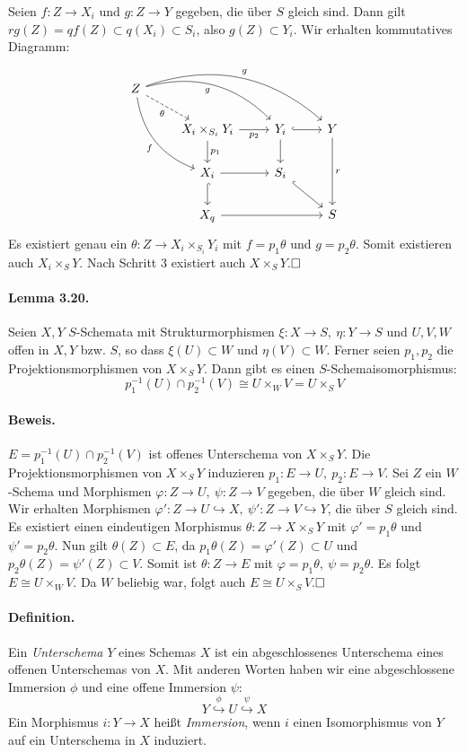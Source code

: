 \documentclass[11pt,b5paper,openany]{memoir}
\def \qed {$\hfill\square$}
\begin{document}
\begin{enumerate}
Seien $f:Z\to X_i$ und $g:Z\to Y$ gegeben, die über $S$ gleich sind. Dann gilt $rg(Z)=qf(Z)\subset q(X_i)\subset S_i$, also $g(Z)\subset Y_i$. Wir erhalten kommutatives Diagramm:
\[\begin{tikzcd}
Z\ar[ddr, "f"', bend right]\ar[rrd, "g"', bend left]\ar[rrrd, "g", bend left]\ar[rd, "\theta"', dashed]\\
& X_i\times_{S_i}Y_i\ar[r, "p_2"']\ar[d, "p_1"] & Y_i\ar[r, hook]\ar[d] & Y\ar[dd, "r"]\\
& X_i\ar[d, hook]\ar[r] & S_i\ar[dr, hook] &\\
& X\ar[rr]_q & & S
\end{tikzcd} \]
Es existiert genau ein $\theta:Z\to X_i\times_{S_i} Y_i$ mit $f=p_1\theta$ und $g=p_2\theta$. Somit existieren auch $X_i\times_SY$. Nach Schritt 3 existiert auch $X\times_SY$.\qed
\end{enumerate}

\paragraph{Lemma 3.20.}\label{3.20} Seien $X,Y$ $S$-Schemata mit Strukturmorphismen $\xi:X\to S,\ \eta:Y\to S$ und $U,V,W$ offen in $X,Y$ bzw. $S$, so dass $\xi(U)\subset W$ und $\eta(V)\subset W$. Ferner seien $p_1,p_2$ die Projektionsmorphismen von $X\times_SY$. Dann gibt es einen $S$-Schemaisomorphismus:
\[p_1^{-1}(U)\cap p_2^{-1}(V)\cong U\times_WV=U\times_SV \]

\paragraph{Beweis.} $E=p_1^{-1}(U)\cap p_2^{-1}(V)$ ist offenes Unterschema von $X\times_SY$. Die Projektionsmorphismen von $X\times_SY$ induzieren $p_1:E\to U,\ p_2:E\to V$. Sei $Z$ ein $W$-Schema und Morphismen $\varphi:Z\to U,\ \psi:Z\to V$ gegeben, die über $W$ gleich sind. Wir erhalten Morphismen $\varphi':Z\to U\hookrightarrow X,\ \psi':Z\to V\hookrightarrow Y$, die über $S$ gleich sind. Es existiert einen eindeutigen Morphismus $\theta:Z\to X\times_SY$ mit $\varphi'=p_1\theta$ und $\psi'=p_2\theta$. Nun gilt $\theta(Z)\subset E$, da $p_1\theta(Z)=\varphi'(Z)\subset U$ und $p_2\theta(Z)=\psi'(Z)\subset V$. Somit ist $\theta:Z\to E$ mit $\varphi=p_1\theta,\ \psi=p_2\theta$. Es folgt $E\cong U\times_WV$. Da $W$ beliebig war, folgt auch $E\cong U\times_SV$.\qed 

\paragraph{Definition.} Ein \textit{Unterschema} $Y$ eines Schemas $X$ ist ein abgeschlossenes Unterschema eines offenen Unterschemas von $X$. Mit anderen Worten haben wir eine abgeschlossene Immersion $\phi$ und eine offene Immersion $\psi$:
\[Y\stackrel{\phi}{\hookrightarrow} U\stackrel{\psi}{\hookrightarrow}X \]
Ein Morphismus $i:Y\to X$ heißt \textit{Immersion}, wenn $i$ einen Isomorphismus von $Y$ auf ein Unterschema in $X$ induziert.
\end{document}
